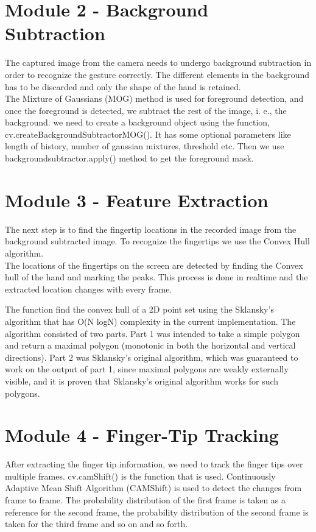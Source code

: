 \documentclass{scrreprt}
\begin{document}
\section{Module 2 - Background Subtraction}
The captured image from the camera needs to undergo background subtraction in order to recognize the gesture correctly. 
The different elements in the background has to be discarded and only the shape of the hand is retained. 
\\
The Mixture of Gaussians (MOG) method is used for foreground detection, and once the foreground is detected, we subtract the rest of the image, i. e., the background.
we need to create a background object using the function, cv.createBackgroundSubtractorMOG(). 
It has some optional parameters like length of history, number of gaussian mixtures, threshold etc. 
Then we use backgroundsubtractor.apply() method to get the foreground mask.
\section{Module 3 - Feature Extraction}
The next step is to find the fingertip locations in the recorded image from the background subtracted image.
To recognize the fingertips we use the Convex Hull algorithm. 
\\
The locations of the fingertips on the screen are detected by finding the Convex hull of the 
hand and marking the peaks. This process is done in realtime and the extracted location changes
 with every frame. 
 
 The function find the convex hull of a 2D point set using the Sklansky’s algorithm
 that has O(N logN) complexity in the current implementation. The algorithm consisted of two parts. 
 Part 1 was intended to take a simple polygon and return a maximal polygon (monotonic in both the 
 horizontal and vertical directions). Part 2 was Sklansky's original algorithm, which
 was guaranteed to work on the output of part 1, since maximal polygons are weakly externally visible,
 and it is proven that Sklansky's original algorithm works for such polygons.

\section{Module 4 - Finger-Tip Tracking}
After extracting the finger tip information, we need to track the finger tips over multiple frames. 
cv.camShift() is the function that is used. 
Continuously Adaptive Mean Shift Algorithm (CAMShift) is used to detect the changes from frame to frame. 
The probability distribution of the first frame is taken as a reference for the second frame, 
the probability distribution of the second frame is taken for the third frame and so on and so forth.
\end{document}
